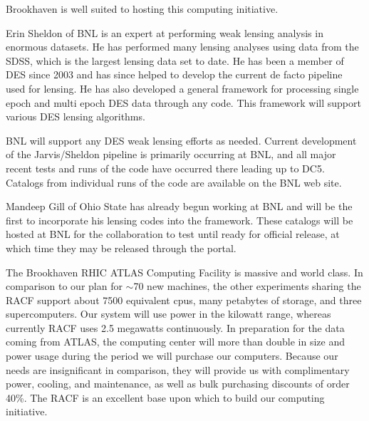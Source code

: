 \documentclass[12pt]{article}
\begin{document}
Brookhaven is well suited to hosting this computing initiative. 

Erin Sheldon of BNL is an expert at performing weak lensing analysis in
enormous datasets. He has performed many lensing analyses using data from the
SDSS, which is the largest lensing data set to date.   He has been a member of
DES since 2003 and has since helped to develop the current de facto
pipeline used for lensing. He has also developed a general framework for
processing single epoch and multi epoch DES data through any code.  This
framework will support various DES lensing algorithms.

BNL will support any DES weak lensing efforts as needed.  Current development
of the Jarvis/Sheldon pipeline is primarily occurring at BNL, and all major
recent tests and runs of the code have occurred there leading up to DC5.  Catalogs
from individual runs of the code are available on the BNL web site.

Mandeep Gill of Ohio State has already begun working at BNL and will be the
first to incorporate his lensing codes into the framework.  These catalogs will
be hosted at BNL for the collaboration to test until ready for official release,
at which time they may be released through the portal.


The Brookhaven RHIC ATLAS Computing Facility is massive and world class.  In
comparison to our plan for $\sim$70 new machines, the other experiments sharing
the RACF support about 7500 equivalent cpus, many petabytes of storage, and
three supercomputers.  Our system will use power in the kilowatt range, whereas
currently RACF uses 2.5 megawatts continuously.  In preparation for the data
coming from ATLAS, the computing center will more than double in size and power
usage during the period we will purchase our computers.  Because our needs are
insignificant in comparison, they will provide us with complimentary power,
cooling, and maintenance, as well as bulk purchasing discounts of order 40\%.
The RACF is an excellent base upon which to build our computing initiative.




\end{document}
